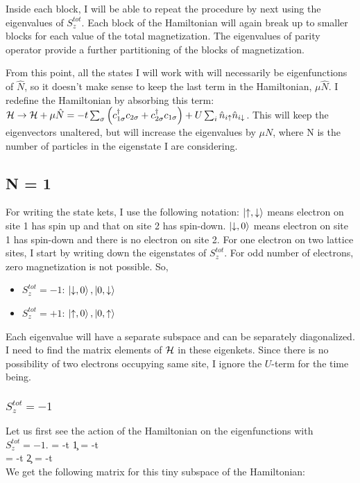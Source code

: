 \documentclass{article}
\begin{document}
Inside each block, I will be able to repeat the procedure by next using the eigenvalues of \(S_z^{tot}\). Each block of the Hamiltonian will again break up to smaller blocks for each value of the total magnetization. The eigenvalues of parity operator provide a further partitioning of the blocks of magnetization.

From this point, all the states I will work with will necessarily be eigenfunctions of \(\hat{N}\), so it doesn't make sense to keep the last term in the Hamiltonian, \(\mu \hat{N}\). I redefine the Hamiltonian by absorbing this term: \(\mathcal{H} \rightarrow \mathcal{H} + \mu \hat{N} = -t\sum_\sigma\left({c_{{1}{\sigma}}^\dagger c_{{2}{\sigma}}+c_{{2}{\sigma}}^\dagger c_{{1}{\sigma}}}\right) + U\sum_i\hat{n}_{i\uparrow}\hat{n}_{i\downarrow}\). This will keep the eigenvectors unaltered, but will increase the eigenvalues by \(\mu N\), where N is the number of particles in the eigenstate I are considering.

\subsection{N = 1}
For writing the state kets, I use the following notation: \(\ket{\uparrow,\downarrow}\) means electron on site 1 has spin up and that on site 2 has spin-down. \(\ket{\downarrow, 0}\) means electron on site 1 has spin-down and there is no electron on site 2. 
\pp For one electron on two lattice sites, I start by writing down the eigenstates of \(S_z^{tot}\). For odd number of electrons, zero magnetization is not possible. So,
\begin{itemize}
\item \(S_z^{tot} = -1\): \(\ket{\downarrow,0}, \ket{0, \downarrow}\)
\item \(S_z^{tot} = +1\): \(\ket{\uparrow,0}, \ket{0, \uparrow}\)
\end{itemize}
Each eigenvalue will have a separate subspace and can be separately diagonalized. I need to find the matrix elements of \(\mathcal{H}\) in these eigenkets. Since there is no possibility of two electrons occupying same site, I ignore the \(U\)-term for the time being. 
\subsubsection{\(S_z^{tot} = -1\)}
Let us first see the action of the Hamiltonian on the eigenfunctions with \(S_z^{tot} = -1\).
\beq
\ham{} = -t \c{1}{\downarrow} = -t \\
\ham{} = -t \c{2}{\downarrow} = -t \\
\eeq
We get the following matrix for this tiny subspace of the Hamiltonian:
\beq
{}
\eeq
\end{document}
